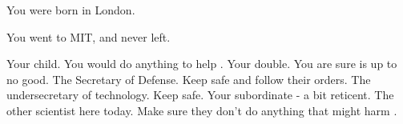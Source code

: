 \documentclass[char]{guildcamp3}
\begin{document}
\begin{itemz}[Notes]
  \item You were born in London.
  \item You went to MIT, and never left.
\end{itemz}


\begin{contacts}
  \contact{\cSciOne{}} Your child. You would do anything to help \cSciOne{\them}. 
  \contact{\cRogueTwo{}} Your double. You are sure \cRogueTwo{\they} is up to no good. 
  \contact{\cPoliOne{}} The Secretary of Defense. Keep \cPoliOne{\them} safe and follow their orders.
  \contact{\cPoliTwo{}} The undersecretary of technology. Keep \cPoliTwo{\them} safe.
  \contact{\cSpecOpTwo{}} Your subordinate - a bit reticent.
  \contact{\cSciTwo{}} The other scientist here today. Make sure they don't do anything that might harm \cSciOne{\informal}.
\end{contacts}
\end{document}
